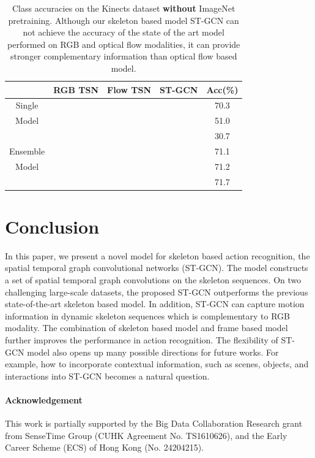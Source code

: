 \documentclass[letterpaper]{article} %
\begin{document}
\begin{table}
	\small
	\centering
	\begin{tabular}{c|ccc|c}
		  &RGB TSN   &   Flow TSN &   ST-GCN   &Acc(\%) \\
		\hline
		\hline
		 Single&\checkmark &            &            & 70.3\\ 
		 Model&           & \checkmark &            & 51.0\\ 
		 &           &            & \checkmark & 30.7\\ \hline
		 Ensemble&\checkmark &\checkmark  &            & 71.1\\
		 Model&\checkmark &            & \checkmark & 71.2\\ 
		 &\checkmark &\checkmark  & \checkmark & 71.7\\ 
		
	\end{tabular}
	\caption{Class accuracies on the Kinects dataset \textbf{without} ImageNet pretraining. Although our skeleton based model ST-GCN can not achieve the accuracy of the state of the art model performed on RGB and optical flow modalities, it can provide stronger complementary information than optical flow based model.}\label{tab:kinetics_ensemble}
\end{table}


\section{Conclusion}
In this paper, we present a novel model for skeleton based action recognition, the spatial temporal graph convolutional networks (ST-GCN).
The model constructs a set of spatial temporal graph convolutions on the skeleton sequences.
On two challenging large-scale datasets, the proposed ST-GCN outperforms the previous state-of-the-art skeleton based model. 
In addition, ST-GCN can capture motion information in dynamic skeleton sequences which is complementary to RGB modality. The combination of skeleton based model and frame based model further improves the performance in action recognition.
The flexibility of ST-GCN model also opens up many possible directions for future works. 
For example, how to incorporate contextual information, such as scenes, objects, and interactions into ST-GCN becomes a natural question. 

\paragraph{Acknowledgement} This work is partially supported by the Big Data Collaboration Research grant from SenseTime Group (CUHK Agreement No. TS1610626), and the Early Career Scheme (ECS) of Hong Kong (No. 24204215).




{
	
	
}
\end{document}
